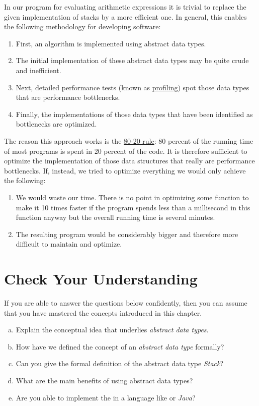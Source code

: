 \begin{enumerate}
       In our program for evaluating  arithmetic expressions it is trivial to replace the given
       implementation of stacks by a more efficient one.  In general,
       this enables the following methodology for developing software:  
       \begin{enumerate}
       \item First, an algorithm is implemented using abstract data types.
       \item The initial implementation of these abstract data types may be quite crude and inefficient.
       \item Next, detailed performance tests (known as 
             \href{http://en.wikipedia.org/wiki/Profiling_(computer_programming)}{profiling})
             spot those data types that are performance bottlenecks.
       \item Finally, the implementations of those data types that have been identified as bottlenecks are optimized.
       \end{enumerate}
       The reason this approach works is the 
       \href{http://en.wikipedia.org/wiki/Pareto_principle#In_software}{80-20 rule}:  
       80 percent of the running time of most programs is spent in 20 percent of the code.  It is
       therefore sufficient to optimize the 
       implementation of those data structures that really are performance bottlenecks.  If,
       instead, we tried to optimize everything we would only achieve the following:
       \begin{enumerate}
       \item We would waste our time.  There is no point in optimizing some function to make it 10 times
             faster if the program spends less than a millisecond in this function anyway but the
             overall running time is several minutes.
       \item The resulting program would be considerably bigger and therefore more difficult to 
             maintain and optimize.
       \end{enumerate}
 \end{enumerate}

\section{Check Your Understanding}
If you are able to answer the questions below confidently, then you can assume that you have mastered the concepts
introduced in this chapter.
\begin{enumerate}[(a)]
\item Explain the conceptual idea that underlies \emph{abstract data types}.
\item How have we defined the concept of an \emph{abstract data type} formally?
\item Can you give the formal definition of the abstract data type \textsl{Stack}?
\item What are the main benefits of using abstract data types?
\item Are you able to implement the  in a language like  or \textsl{Java}?
\end{enumerate}



